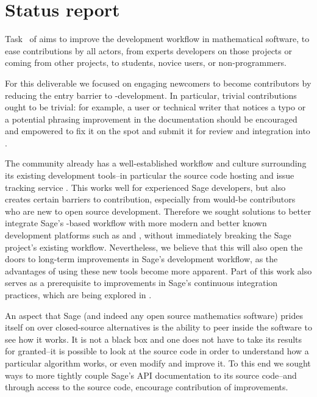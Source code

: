 \hypertarget{status-report}{%
\section{Status report}\label{status-report}}


Task~ of
 aims to improve the development
workflow in mathematical software, to ease contributions by all
actors, from experts developers on those projects or coming from other
projects, to students, novice users, or non-programmers.

For this deliverable we focused on engaging newcomers to become
contributors by reducing the entry barrier to \Sage-development. In
particular, trivial contributions ought to be trivial: for example, a
user or technical writer that notices a typo or a potential phrasing
improvement in the documentation should be encouraged and empowered to
fix it on the spot and submit it for review and integration into \Sage.

The \Sage community already has a
well-established workflow and culture
surrounding its existing development tools--in particular the source code
hosting and issue tracking service \Trac.  This works well for experienced
Sage developers, but also creates certain barriers to contribution, especially
from would-be contributors who are new to open source development.
Therefore
we sought solutions to better integrate Sage's \Trac-based workflow with more
modern and better known development platforms such as \GitHub and \GitLab,
without immediately breaking the Sage project's existing workflow.
%
%
Nevertheless, we believe that this will also open the doors to long-term
improvements in Sage's development workflow, as the advantages of using these
new tools become more apparent.  Part of this work also serves as a
prerequisite to improvements in Sage's continuous integration practices, which
are being explored in
.

An aspect that Sage (and indeed any open source mathematics software) prides
itself on over closed-source alternatives is the ability to peer inside the
software to see how it works.  It is not a black box and one does not have to
take its results for granted--it is possible to look at the source code in
order to understand how a particular algorithm works, or even modify and
improve it.  To this end we sought ways to more tightly couple Sage's API
documentation to its source code--and through access to the source code,
encourage contribution of improvements.

